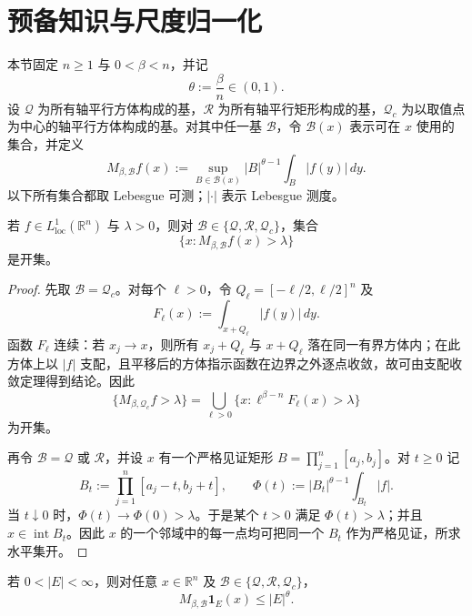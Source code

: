 \section{预备知识与尺度归一化}
\label{sec:preliminaries}

本节固定 $n\geq1$ 与 $0<\beta<n$，并记
\[
 \theta:=\frac\beta n\in(0,1).
\]
设 $\mathcal Q$ 为所有轴平行方体构成的基，$\mathcal R$ 为所有轴平行矩形构成的基，$\mathcal Q_c$ 为以取值点为中心的轴平行方体构成的基。对其中任一基 $\mathcal B$，令 $\mathcal B(x)$ 表示可在 $x$ 使用的集合，并定义
\begin{equation}
 M_{\beta,\mathcal B}f(x):=
 \sup_{B\in\mathcal B(x)}|B|^{\theta-1}\int_B|f(y)|\,dy.
 \label{fnd:def-max}
\end{equation}
以下所有集合都取 Lebesgue 可测；$|\cdot|$ 表示 Lebesgue 测度。

\begin{lemma}[严格水平集的可测性]
\label{fnd:measurability}
若 $f\in L^1_{\mathrm{loc}}(\mathbb R^n)$ 与 $\lambda>0$，则对
$\mathcal B\in\{\mathcal Q,\mathcal R,\mathcal Q_c\}$，集合
\[
 \{x:M_{\beta,\mathcal B}f(x)>\lambda\}
\]
是开集。
\end{lemma}

\begin{proof}
先取 $\mathcal B=\mathcal Q_c$。对每个 $\ell>0$，令
$Q_\ell=[-\ell/2,\ell/2]^n$ 及
\[
 F_\ell(x):=\int_{x+Q_\ell}|f(y)|\,dy.
\]
函数 $F_\ell$ 连续：若 $x_j\to x$，则所有 $x_j+Q_\ell$ 与 $x+Q_\ell$ 落在同一有界方体内；在此方体上以 $|f|$ 支配，且平移后的方体指示函数在边界之外逐点收敛，故可由支配收敛定理得到结论。因此
\[
 \{M_{\beta,\mathcal Q_c}f>\lambda\}
 =\bigcup_{\ell>0}\{x:\ell^{\beta-n}F_\ell(x)>\lambda\}
\]
为开集。

再令 $\mathcal B=\mathcal Q$ 或 $\mathcal R$，并设 $x$ 有一个严格见证矩形
$B=\prod_{j=1}^n[a_j,b_j]$。对 $t\geq0$ 记
\[
 B_t:=\prod_{j=1}^n[a_j-t,b_j+t],\qquad
 \Phi(t):=|B_t|^{\theta-1}\int_{B_t}|f|.
\]
当 $t\downarrow0$ 时，$\Phi(t)\to\Phi(0)>\lambda$。于是某个 $t>0$ 满足 $\Phi(t)>\lambda$；并且 $x\in\operatorname{int}B_t$。因此 $x$ 的一个邻域中的每一点均可把同一个 $B_t$ 作为严格见证，所求水平集开。
\end{proof}

\begin{lemma}[示性函数的自然顶层]
\label{fnd:top-level}
若 $0<|E|<\infty$，则对任意 $x\in\mathbb R^n$ 及
$\mathcal B\in\{\mathcal Q,\mathcal R,\mathcal Q_c\}$，
\[
 M_{\beta,\mathcal B}\mathbf1_E(x)\leq |E|^\theta.
\]
\end{lemma}

